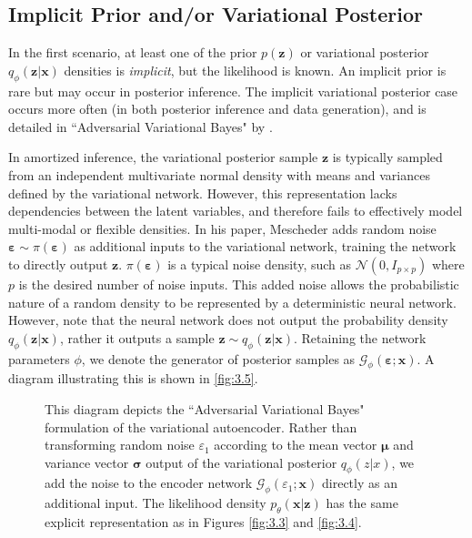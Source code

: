 \documentclass[honours,12pt, twoside]{unswthesis}
\numberwithin{equation}{section}
\theoremstyle{definition}
\begin{document}
\subsection{Implicit Prior and/or Variational Posterior}\label{sec:3.8.1}
In the first scenario, at least one of the prior $p(\bm{z})$ or variational posterior $q_\phi(\bm{z}|\bm{x})$ densities is \textit{implicit}, but the likelihood is known. An implicit prior is rare but may occur in posterior inference. The implicit variational posterior case occurs more often (in both posterior inference and data generation), and is detailed in ``Adversarial Variational Bayes" by \citet{mescheder}.

In amortized inference, the variational posterior sample $\bm{z}$ is typically sampled from an independent multivariate normal density with means and variances defined by the variational network. However, this representation lacks dependencies between the latent variables, and therefore fails to effectively model multi-modal or flexible densities. In his paper, Mescheder adds random noise $\bm{\varepsilon}\sim \pi(\bm{\varepsilon})$ as additional inputs to the variational network, training the network to directly output $\bm{z}$. $\pi(\bm{\varepsilon})$ is a typical noise density, such as $\mathcal{N}(0,I_{p\times p})$ where $p$ is the desired number of noise inputs. This added noise allows the probabilistic nature of a random density to be represented by a deterministic neural network. However, note that the neural network does not output the probability density $q_\phi(\bm{z}|\bm{x})$, rather it outputs a sample $\bm{z}\sim q_\phi(\bm{z}|\bm{x})$. Retaining the network parameters $\phi$, we denote the generator of posterior samples as $\mathcal{G}_\phi(\bm{\varepsilon};\bm{x})$. A diagram illustrating this is shown in \autoref{fig:3.5}.
\begin{figure}[h]
  \centering
   \caption{\small This diagram depicts the ``Adversarial Variational Bayes" formulation of the variational autoencoder. Rather than transforming random noise $\varepsilon_1$ according to the mean vector $\bm{\mu}$ and variance vector $\bm{\sigma}$ output of the variational posterior $q_\phi(z|x)$, we add the noise to the encoder network $\mathcal{G}_\phi(\varepsilon_1;\bm{x})$ directly as an additional input. The likelihood density $p_\theta(\bm{x}|\bm{z})$ has the same explicit representation as in Figures \ref{fig:3.3} and \ref{fig:3.4}.}
   \label{fig:3.5}
\end{figure}
\end{document}

